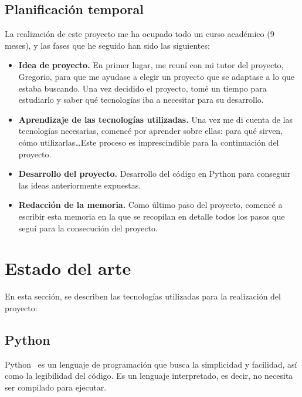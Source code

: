\documentclass[a4paper, 12pt]{book}
\begin{document}
\section{Planificación temporal}
\label{sec:planificacion-temporal}
La realización de este proyecto me ha ocupado todo un curso académico (9 meses), y las fases que he seguido han sido las siguientes:
\begin{itemize}
	\item \textbf{Idea de proyecto.} En primer lugar, me reuní con mi tutor del proyecto, Gregorio, para que me ayudase a elegir un proyecto que se adaptase a lo que estaba buscando. Una vez decidido el proyecto, tomé un tiempo para estudiarlo y saber qué tecnologías iba a necesitar para su desarrollo.
	\item \textbf{Aprendizaje de las tecnologías utilizadas.} Una vez me di cuenta de las tecnologías necesarias, comencé por aprender sobre ellas: para qué sirven, cómo utilizarlas\ldots Este proceso es imprescindible para la continuación del proyecto.
	\item \textbf{Desarrollo del proyecto.} Desarrollo del código en Python para conseguir las ideas anteriormente expuestas.
	\item \textbf{Redacción de la memoria.} Como último paso del proyecto, comencé a escribir esta memoria en la que se recopilan en detalle todos los pasos que seguí para la consecución del proyecto.
\end{itemize}



\cleardoublepage
\chapter{Estado del arte}
\label{chap:estadoarte} %

En esta sección, se describen las tecnologías utilizadas para la realización del proyecto:

\section{Python}
\label{sec:python}
Python~\cite{python:1} es un lenguaje de programación que busca la simplicidad y facilidad, así como la legibilidad del código. Es un lenguaje interpretado, es decir, no necesita ser compilado para ejecutar.\\
\end{document}
